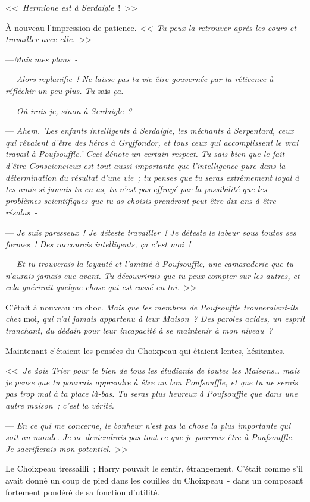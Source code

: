 <<~\emph{Hermione est à Serdaigle}~!~>>

À nouveau l'impression de patience. \emph{<<~Tu peux la retrouver après les cours et travailler avec elle.}~>>

---\emph{Mais mes plans~-}

--- \emph{Alors replanifie~! Ne laisse pas ta vie être gouvernée par ta réticence à réfléchir un peu plus. Tu} sais \emph{ça.}

--- \emph{Où irais-je, sinon à Serdaigle~?}

--- \emph{Ahem. 'Les enfants intelligents à Serdaigle, les méchants à Serpentard, ceux qui rêvaient d'être des héros à Gryffondor, et tous ceux qui accomplissent le vrai travail à Poufsouffle.' Ceci dénote un certain respect. Tu sais bien que le fait d'être Consciencieux est tout aussi importante que l'intelligence pure dans la détermination du résultat d'une vie~; tu penses que tu seras extrêmement loyal à tes amis si jamais tu en as, tu n'est pas effrayé par la possibilité que les problèmes scientifiques que tu as choisis prendront peut-être dix ans à être résolus~-}

--- \emph{Je suis paresseux~! Je déteste travailler~! Je déteste le labeur sous toutes ses formes~! Des raccourcis intelligents, ça c'est moi~!}

--- \emph{Et tu trouverais la loyauté et l'amitié à Poufsouffle, une camaraderie que tu n'aurais jamais eue avant. Tu découvrirais que tu peux compter sur les autres, et cela guérirait quelque chose qui est cassé en toi.}~>>

C'était à nouveau un choc. \emph{Mais que les membres de Poufsouffle trouveraient-ils chez} moi\emph{, qui n'ai jamais appartenu à leur Maison~? Des paroles acides, un esprit tranchant, du dédain pour leur incapacité à se maintenir à mon niveau~?}

Maintenant c'étaient les pensées du Choixpeau qui étaient lentes, hésitantes.

<<~\emph{Je dois Trier pour le bien de tous les étudiants de toutes les Maisons… mais je pense que tu pourrais apprendre à être un bon Poufsouffle, et que tu ne serais pas trop mal à ta place là-bas. Tu seras plus heureux à Poufsouffle que dans une autre maison~; c'est la vérité.}

--- \emph{En ce qui me concerne, le bonheur n'est pas la chose la plus importante qui soit au monde. Je ne deviendrais pas tout ce que je pourrais être à Poufsouffle. Je sacrifierais mon potentiel.}~>>

Le Choixpeau tressailli~; Harry pouvait le sentir, étrangement. C'était comme s'il avait donné un coup de pied dans les couilles du Choixpeau~- dans un composant fortement pondéré de sa fonction d'utilité.


